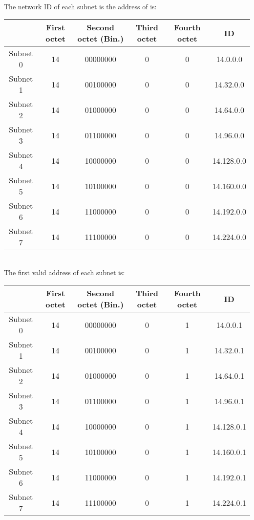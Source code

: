 \documentclass{article}
\begin{document}
~\\The network ID of each subnet is the address of is:
\begin{table}[h!]
\centering
\begin{tabular}{|c|c|c|c|c|c|}
\hline
& First octet & Second octet (Bin.) & Third octet & Fourth octet & ID \\ \hline
Subnet 0 & 14 & 00000000 & 0 & 0 & 14.0.0.0 \\
Subnet 1 & 14 & 00100000 & 0 & 0 & 14.32.0.0 \\
Subnet 2 & 14 & 01000000 & 0 & 0 & 14.64.0.0 \\
Subnet 3 & 14 & 01100000 & 0 & 0 & 14.96.0.0\\
Subnet 4 & 14 & 10000000 & 0 & 0 & 14.128.0.0\\
Subnet 5 & 14 & 10100000 & 0 & 0 & 14.160.0.0 \\
Subnet 6 & 14 & 11000000 & 0 & 0 & 14.192.0.0\\
Subnet 7 & 14 & 11100000 & 0 & 0 & 14.224.0.0 \\ \hline
\end{tabular}
\end{table}

~\\The first valid address of each subnet is:
\begin{table}[h!]
\centering
\begin{tabular}{|c|c|c|c|c|c|}
\hline
& First octet & Second octet (Bin.) & Third octet & Fourth octet & ID \\ \hline
Subnet 0 & 14 & 00000000 & 0 & 1 & 14.0.0.1 \\
Subnet 1 & 14 & 00100000 & 0 & 1 & 14.32.0.1 \\
Subnet 2 & 14 & 01000000 & 0 & 1 & 14.64.0.1 \\
Subnet 3 & 14 & 01100000 & 0 & 1 & 14.96.0.1\\
Subnet 4 & 14 & 10000000 & 0 & 1 & 14.128.0.1\\
Subnet 5 & 14 & 10100000 & 0 & 1 & 14.160.0.1 \\
Subnet 6 & 14 & 11000000 & 0 & 1 & 14.192.0.1\\
Subnet 7 & 14 & 11100000 & 0 & 1 & 14.224.0.1 \\ \hline
\end{tabular}
\end{table}
\end{document}
